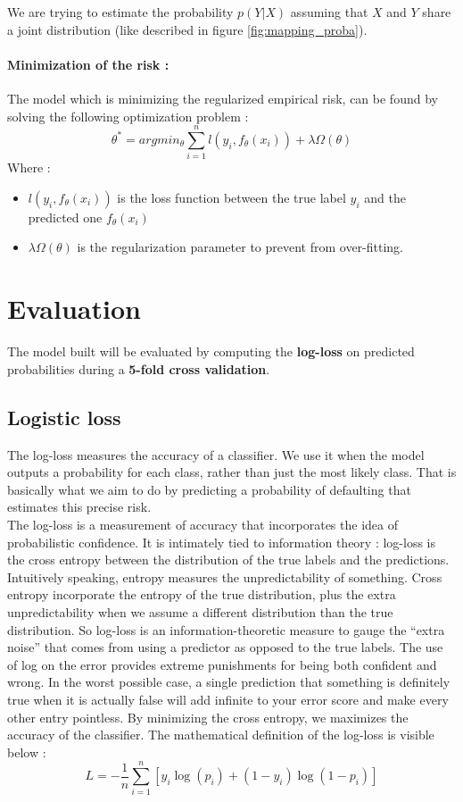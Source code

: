 	We are trying to estimate the probability $p(Y|X)$ assuming that $X$ and $Y$ share a joint distribution (like described in figure \ref{fig:mapping_proba}).

\newpage

\paragraph{Minimization of the risk :}
	The model which is minimizing the regularized empirical risk, can be found by solving the following optimization problem :
	$$\theta^*=argmin_\theta\sum_{i=1}^n l(y_i,f_\theta(x_i)) + \lambda\Omega(\theta)$$
	Where :
	\begin{itemize}
		\item $l(y_i,f_\theta(x_i))$ is the loss function between the true label $y_i$ and the predicted one $f_\theta(x_i)$
		\item $\lambda\Omega(\theta)$ is the regularization parameter to prevent from over-fitting.
	\end{itemize}

\section{Evaluation}
	The model built will be evaluated by computing the \textbf{log-loss} on predicted probabilities during a \textbf{5-fold cross validation}.

	\subsection{Logistic loss}
		The log-loss measures the accuracy of a classifier. We use it when the model outputs a probability for each class, rather than just the most likely class. That is basically what we aim to do by predicting a probability of defaulting that estimates this precise risk.\\

		The log-loss is a measurement of accuracy that incorporates the idea of probabilistic confidence. It is intimately tied to information theory : log-loss is the cross entropy between the distribution of the true labels and the predictions. Intuitively speaking, entropy measures the unpredictability of something. Cross entropy incorporate the entropy of the true distribution, plus the extra unpredictability when we assume a different distribution than the true distribution. So log-loss is an information-theoretic measure to gauge the ``extra noise'' that comes from using a predictor as opposed to the true labels. The use of log on the error provides extreme punishments for being both confident and wrong. In the worst possible case, a single prediction that something is definitely true when it is actually false will add infinite to your error score and make every other entry pointless. By minimizing the cross entropy, we maximizes the accuracy of the classifier. The mathematical definition of the log-loss is visible below :
		$$L = -\frac{1}{n}\sum_{i=1}^{n}[y_i\log(p_i)+(1-y_i)\log(1-p_i)]$$


